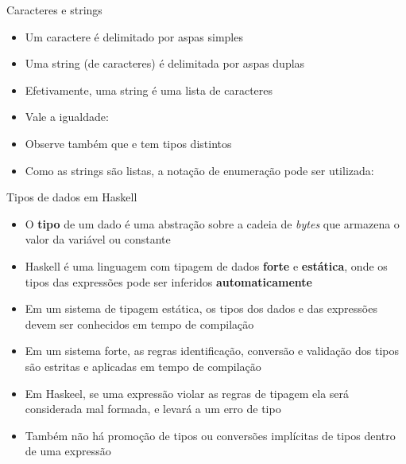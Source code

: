 \begin{frame}[fragile]{Caracteres e strings}

    \begin{itemize}
        \item Um caractere é delimitado por aspas simples


        \item Uma string (de caracteres) é delimitada por aspas duplas


        \item Efetivamente, uma string é uma lista de caracteres


        \item Vale a igualdade: 

        \item Observe também que  e  tem tipos distintos

        \item Como as strings são listas, a notação de enumeração pode ser utilizada:

    \end{itemize}

\end{frame}

\begin{frame}[fragile]{Tipos de dados em Haskell}

    \begin{itemize}
        \item O \textbf{tipo} de um dado é uma abstração sobre a cadeia de \textit{bytes} que
            armazena o valor da variável ou constante

        \item Haskell é uma linguagem com tipagem de dados \textbf{forte} e \textbf{estática},
            onde os tipos das expressões pode ser inferidos \textbf{automaticamente}

        \item Em um sistema de tipagem estática, os tipos dos dados e das expressões devem ser 
            conhecidos em tempo de compilação

        \item Em um sistema forte, as regras identificação, conversão e validação dos tipos
            são estritas e aplicadas em tempo de compilação

        \item Em Haskeel, se uma expressão violar as regras de tipagem ela será considerada mal 
            formada, e levará a um erro de tipo

        \item Também não há promoção de tipos ou conversões implícitas de tipos dentro de 
            uma expressão

    \end{itemize}

\end{frame}

